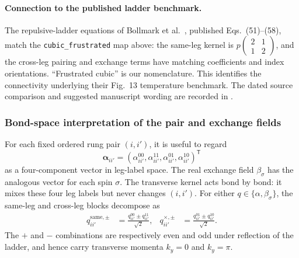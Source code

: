 \documentclass[11pt]{article}
\begin{document}
\paragraph{Connection to the published ladder benchmark.}
The repulsive-ladder equations of Bollmark et al.~\cite{bollmark2023},
published Eqs.~(51)--(58), match the \texttt{cubic\_frustrated} map above:
the same-leg kernel is \(p\left(\begin{smallmatrix}2&1\\1&2\end{smallmatrix}\right)\),
and the cross-leg pairing and exchange terms have matching coefficients and
index orientations.  ``Frustrated cubic'' is our nomenclature.  This identifies
the connectivity underlying their Fig.~13 temperature benchmark.
The dated source comparison and suggested manuscript wording are recorded in
.

\subsubsection{Bond-space interpretation of the pair and exchange fields}

For each fixed ordered rung pair \((i,i')\), it is useful to regard
\begin{equation}
 \bm{\alpha}_{ii'}=
 \left(\alpha^{00}_{ii'},\alpha^{11}_{ii'},
       \alpha^{01}_{ii'},\alpha^{10}_{ii'}\right)^{\mathsf T}
\end{equation}
as a four-component vector in leg-label space.  The real exchange field
\(\beta_\sigma\) has the analogous vector for each spin \(\sigma\).  The
transverse kernel acts bond by bond: it mixes these four leg labels but never
changes \((i,i')\).  For either
\(q\in\{\alpha,\beta_\sigma\}\), the same-leg and cross-leg blocks decompose as
\begin{align}
 q^{\mathrm{same},\pm}_{ii'}
 &=\frac{q^{00}_{ii'}\pm q^{11}_{ii'}}{\sqrt{2}},
 &
 q^{\times,\pm}_{ii'}
 &=\frac{q^{01}_{ii'}\pm q^{10}_{ii'}}{\sqrt{2}}.
 \label{eq:bond-leg-modes}
\end{align}
The \(+\) and \(-\) combinations are respectively even and odd under reflection
of the ladder, and hence carry transverse momenta \(k_y=0\) and \(k_y=\pi\).
\end{document}
